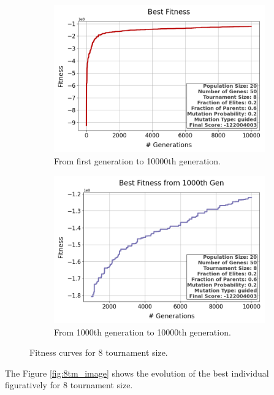 \documentclass{assignment}
\begin{document}
\begin{figure}[h!]
    \begin{subfigure}{0.5\textwidth}
        \includegraphics[width=\textwidth]{figures/best_fitness_output_20_50_8_0.2_0.6_0.2_guided.png}
        \caption{From first generation to 10000th generation.}
    \end{subfigure}\hfill
    \begin{subfigure}{0.5\textwidth}
        \includegraphics[width=\textwidth]{figures/best_fitness_1000_output_20_50_8_0.2_0.6_0.2_guided.png}
        \caption{From 1000th generation to 10000th generation.}
    \end{subfigure}
    \caption{Fitness curves for 8 tournament size.}
\label{fig:8tm}
\end{figure}

The Figure \ref{fig:8tm_image} shows the evolution of the best individual figuratively for 8 tournament size.
\end{document}
